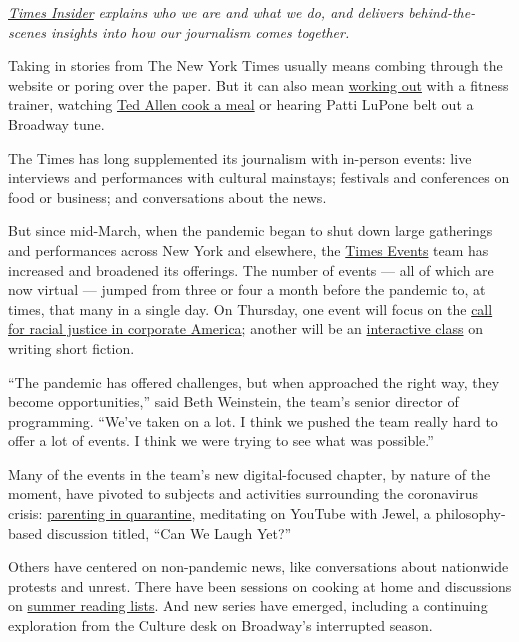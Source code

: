 \href{https://www.nytimes3xbfgragh.onion/series/times-insider}{\emph{Times
Insider}} \emph{explains who we are and what we do, and delivers
behind-the-scenes insights into how our journalism comes together.}

Taking in stories from The New York Times usually means combing through
the website or poring over the paper. But it can also mean
\href{https://timesevents.nytimes3xbfgragh.onion/thejoyofgymlessworkouts}{working
out} with a fitness trainer, watching
\href{https://timesevents.nytimes3xbfgragh.onion/kidscooking}{Ted Allen
cook a meal} or hearing Patti LuPone belt out a Broadway tune.

The Times has long supplemented its journalism with in-person events:
live interviews and performances with cultural mainstays; festivals and
conferences on food or business; and conversations about the news.

But since mid-March, when the pandemic began to shut down large
gatherings and performances across New York and elsewhere, the
\href{https://timesevents.nytimes3xbfgragh.onion/}{Times Events} team
has increased and broadened its offerings. The number of events --- all
of which are now virtual --- jumped from three or four a month before
the pandemic to, at times, that many in a single day. On Thursday, one
event will focus on the
\href{https://timesevents.nytimes3xbfgragh.onion/dealbookdebrief0806}{call
for racial justice in corporate America}; another will be an
\href{https://timesevents.nytimes3xbfgragh.onion/astorywritingclasswithcurtissittenfeld}{interactive
class} on writing short fiction.

``The pandemic has offered challenges, but when approached the right
way, they become opportunities,'' said Beth Weinstein, the team's senior
director of programming. ``We've taken on a lot. I think we pushed the
team really hard to offer a lot of events. I think we were trying to see
what was possible.''

Many of the events in the team's new digital-focused chapter, by nature
of the moment, have pivoted to subjects and activities surrounding the
coronavirus crisis:
\href{https://timesevents.nytimes3xbfgragh.onion/parenting}{parenting in
quarantine}, meditating on YouTube with Jewel, a philosophy-based
discussion titled, ``Can We Laugh Yet?''

Others have centered on non-pandemic news, like conversations about
nationwide protests and unrest. There have been sessions on cooking at
home and discussions on
\href{https://timesevents.nytimes3xbfgragh.onion/bookreviewlive}{summer
reading lists}. And new series have emerged, including a continuing
exploration from the Culture desk on Broadway's interrupted season.

